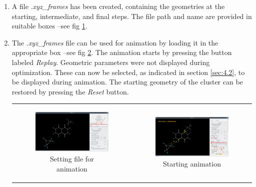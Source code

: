 \documentclass[10pt]{article}
\begin{document}
\begin{enumerate}
\item A file {\it *.xyz\_frames} has been created, containing the geometries
at the starting, intermediate, and final steps. The file path and name 
are provided in suitable boxes --see fig \ref{fig:A6_5}. 

\item The {\it *.xyz\_frames} file can be used
for animation by loading it in the appropriate box --see fig \ref{fig:A6_6}.
The animation starts by pressing the button labeled {\it Replay}.
Geometric parameters were not displayed during optimization.
These can now be selected, as indicated in section \ref{sec:4.2}, to be displayed 
during animation. The starting geometry of the cluster can be restored by pressing
the {\it Reset} button.

\begin{center}
\begin{tabular}{cc}
\begin{minipage}{.48\linewidth}
\begin{figure}[H]
\begin{center}
\includegraphics[width=.8\linewidth]{damqt320_epic_5_b.png}
\end{center}
\caption{{Setting file for animation} \label{fig:A6_5}}
\end{figure}
\end{minipage}
&
\begin{minipage}{.48\linewidth}
\begin{figure}[H]
\begin{center}
\includegraphics[width=.8\linewidth]{damqt320_epic_6_b.png}
\end{center}
\caption{{Starting animation}\label{fig:A6_6}}
\end{figure}
\end{minipage}
\end{tabular}
\end{center}


\end{enumerate}
\end{document}
